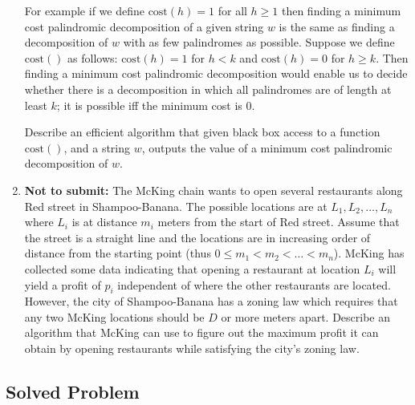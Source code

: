 \documentclass[11pt]{article}
\newcommand{\cost}{\text{cost}}
\begin{document}
\begin{enumerate}
For example if we define $\cost(h) = 1$ for all $h \ge 1$ then finding
a minimum cost palindromic decomposition of a given string $w$ is the
same as finding a decomposition of $w$ with as few palindromes as
possible. Suppose we define $\cost()$ as follows: $\cost(h) = 1$
for $h < k$ and $\cost(h) = 0$ for $h \ge k$. Then finding a
minimum cost palindromic decomposition would enable us to decide
whether there is a decomposition in which all palindromes are
of length at least $k$; it is possible iff the minimum cost is $0$.

Describe an efficient algorithm that given  black box access to
a function $\cost()$, and a string $w$, outputs the
value of a minimum cost palindromic decomposition of $w$.

\item {\bf Not to submit:}   The McKing chain wants to open several restaurants along Red street
  in Shampoo-Banana. The possible locations are at $L_1,L_2, \ldots,
  L_n$ where $L_i$ is at distance $m_i$ meters from the start of Red
  street. Assume that the street is a straight line and the locations
  are in increasing order of distance from the starting point (thus $0
  \leq m_1 < m_2 < \ldots < m_n$). McKing has collected some data
  indicating that opening a restaurant at location $L_i$ will yield a
  profit of $p_i$ independent of where the other restaurants are
  located. However, the city of Shampoo-Banana has a zoning law which
  requires that any two McKing locations should be $D$ or more meters
  apart. Describe an algorithm that McKing can use to figure out the
  maximum profit it can obtain by opening restaurants while
  satisfying the city's zoning law.


\end{enumerate}
\vspace{1in}


\subsection*{Solved Problem}
\end{document}

